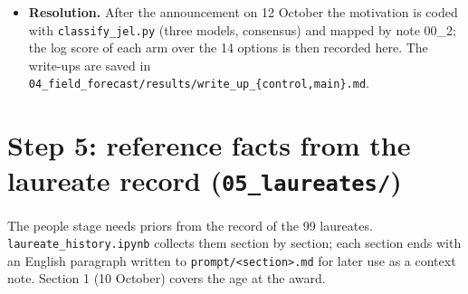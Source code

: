 \documentclass[11pt,a4paper]{article}
\newcommand{\code}[1]{\texttt{#1}}
\begin{document}
\begin{itemize}
  the same signals by its own search (Woodford's Clarivate 2026 listing, the BBVA 2025 prize to Blanchard, Gal\'i and
  Woodford, the Academy's 2026 and 2027 Nobel symposia on international economics) and used them as the small factor
  $R$; the control run used them more.
\item \textbf{Resolution.} After the announcement on 12 October the motivation is coded with \code{classify\_jel.py}
  (three models, consensus) and mapped by note 00\_2; the log score of each arm over the 14 options is then recorded
  here. The write-ups are saved in \code{04\_field\_forecast/results/write\_up\_\{control,main\}.md}.
\end{itemize}

\section{Step 5: reference facts from the laureate record (\code{05\_laureates/})}

The people stage needs priors from the record of the 99 laureates. \code{laureate\_history.ipynb} collects them
section by section; each section ends with an English paragraph written to \code{prompt/<section>.md} for later use
as a context note. Section 1 (10 October) covers the age at the award.
\end{document}
